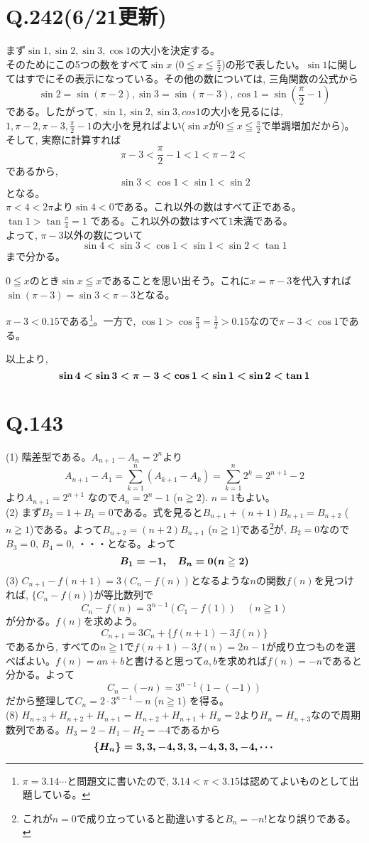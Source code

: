 \documentclass[twocolumn]{jbook}
\theoremstyle{definition}
\newcommand{\bolm}[1]{{\mbox{\boldmath $#1$}}}
\newcommand{\disp}{\displaystyle}
\renewcommand{\leq}{\leqq}
\renewcommand{\geq}{\geqq}
\begin{document}
\section*{Q.242(6/21更新)}
まず$\sin{1},\sin{2},\sin{3},\cos{1}$の大小を決定する。\\
そのためにこの5つの数をすべて$\sin{x}$ ($0\leq x\leq \frac{\pi}{2}$)の形で表したい。$\sin{1}$に関してはすでにその表示になっている。その他の数については, 三角関数の公式から
\[\sin{2} = \sin{(\pi-2)}, \sin{3} = \sin{(\pi-3)}, \cos{1} = \sin{(\frac{\pi}{2} - 1)}\]
である。したがって, $\sin{1},\sin{2}, \sin{3}, cos{1}$の大小を見るには, $1,\pi-2, \pi-3, \frac{\pi}{2} - 1$の大小を見ればよい($\sin{x}$が$0\leq x\leq \frac{\pi}{2}$で単調増加だから)。そして, 実際に計算すれば
\[\pi-3 <  \dfrac{\pi}{2} - 1 < 1 <  \pi-2 < \]
であるから, 
\[\sin{3} < \cos{1} < \sin{1} < \sin{2}\]
となる。\\
$\pi < 4 < 2\pi$より$\sin{4} < 0$である。これ以外の数はすべて正である。\\
$\tan{1} > \tan{\frac{\pi}{4}} = 1$ である。これ以外の数はすべて$1$未満である。\\
よって, $\pi-3$以外の数について
\[\sin{4} < \sin{3} < \cos{1} < \sin{1} < \sin{2} < \tan{1}\]
まで分かる。\par
$0\leq x$のとき$\sin{x} \leq x$であることを思い出そう。これに$x=\pi-3$を代入すれば
$\sin{(\pi-3)} = \sin{3} < \pi-3$となる。\par
$\pi-3 < 0.15$である\footnote{$\pi=3.14\cdots$と問題文に書いたので, $3.14<\pi<3.15$は認めてよいものとして出題している。}。一方で, $\cos{1} > \cos{\frac{\pi}{3}}  = \frac{1}{2} > 0.15$なので$\pi-3< \cos{1}$である。\par
以上より, 
\[\bolm{\sin{4} < \sin{3} < \pi-3 < \cos{1} < \sin{1} < \sin{2} < \tan{1}}\]
\clearpage
\section{Q.143}
(1) 階差型である。$A_{n+1} - A_n = 2^{n}$より
\[A_{n+1} - A_1= \disp\sum_{k=1}^{n} (A_{k+1} - A_k) = \disp\sum_{k=1}^{n} 2^{k} = 2^{n+1} - 2\]
より$A_{n+1} = 2^{n+1}$ なので$A_n = 2^{n}-1$ ($n\geq 2$). $n=1$もよい。\\
(2) まず$B_2 = 1+B_1 = 0$である。式を見ると$B_{n+1} + (n+1)B_{n+1} =B_{n+2}$ ($n\geq 1$)である。よって$B_{n+2} = (n+2)B_{n+1}$ ($n\geq 1$)である\footnote{これが$n=0$で成り立っていると勘違いすると$B_{n} = -n!$となり誤りである。}が, $B_2 = 0$なので$B_3=0$, $B_4=0$, ・・・となる。よって
\[\bolm{B_1 = -1, \quad B_n = 0 (n\geq 2)}\]
(3) $C_{n+1} - f(n+1) = 3(C_n - f(n))$となるような$n$の関数$f(n)$を見つければ, $\{ C_{n} - f(n) \}$が等比数列で
\[C_{n} - f(n) = 3^{n-1}(C_1 - f(1))\quad (n\geq 1)\]
が分かる。$f(n)$を求めよう。
\[C_{n+1} = 3C_{n} + \{f(n+1) - 3f(n)\}\]
であるから, すべての$n\geq 1$で$f(n+1) - 3f(n) = 2n-1$が成り立つものを選べばよい。$f(n) = an+b$と書けると思って$a,b$を求めれば$f(n) = -n$であると分かる。よって
\[C_n  - (-n) = 3^{n-1}(1- (-1))\]
だから整理して$C_n = 2\cdot 3^{n-1} - n$ ($n\geq 1$) を得る。\\
(8) $H_{n+3} + H_{n+2} + H_{n+1} = H_{n+2} + H_{n+1} + H_{n} = 2$より$H_{n} = H_{n+3}$なので周期数列である。$H_3 = 2 - H_1 - H_2 = -4$であるから
\[\bolm{\{ H_n \} = 3,3,-4,3,3,-4,3,3,-4,\cdots} \]
\end{document}
